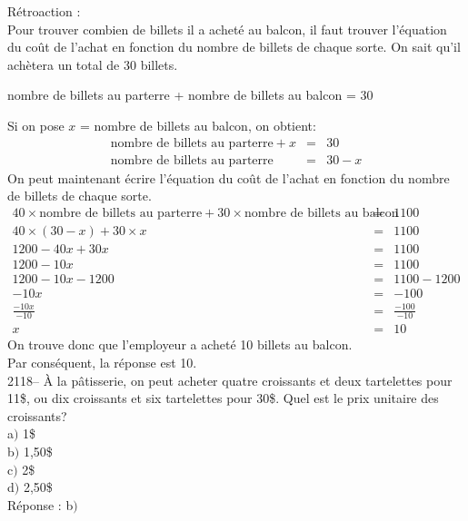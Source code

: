 \documentclass[letterpaper, 12pt]{article}
\begin{document}
R\'etroaction :\\
Pour trouver combien de billets il a achet\'e au balcon, il faut trouver l'\'equation du co\^ut de l'achat en fonction du nombre de billets de chaque sorte. On sait qu'il ach\`etera un total de 30 billets.
\begin{center}
 nombre de billets au parterre + nombre de billets au balcon = 30
\end{center}
Si on pose $x$ = nombre de billets au balcon, on obtient:
\begin{eqnarray*}
 \textrm{nombre de billets au parterre} + x &=& 30\\
 \textrm{nombre de billets au parterre} &=& 30 - x
\end{eqnarray*}
On peut maintenant \'ecrire l'\'equation du co\^ut de l'achat en fonction du nombre de billets de chaque sorte.
\begin{eqnarray*}
 40 \times \textrm{nombre de billets au parterre} + 30 \times \textrm{nombre de billets au balcon} &=& 1100\\
 40 \times (30-x) + 30 \times x &=& 1100\\
1200 - 40x + 30x &=& 1100\\
1200 - 10x &=& 1100\\
1200 - 10x -1200&=& 1100-1200\\
-10x&=& -100\\[2mm]
\frac{-10x}{-10}&=&\frac{-100}{-10}\\[2mm]
x&=& 10
\end{eqnarray*}
On trouve donc que l'employeur a achet\'e 10 billets au balcon.\\
Par cons\'equent, la r\'eponse est 10.\\

2118-- \`A la p\^atisserie, on peut acheter quatre croissants et deux tartelettes pour 11\$, ou dix croissants et six tartelettes pour 30\$. Quel est le prix unitaire des croissants? \\

a$)$ 1\$ \\
b$)$ 1,50\$ \\
c$)$ 2\$ \\
d$)$ 2,50\$ \\

R\'eponse : b$)$\\
\end{document}
